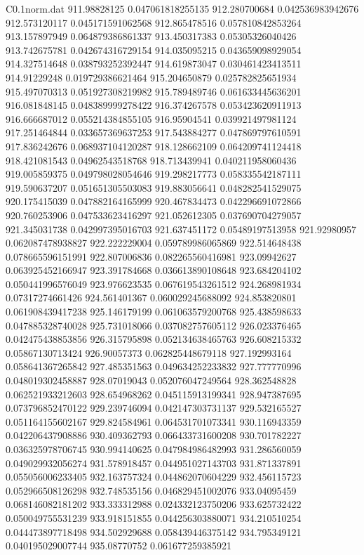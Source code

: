 \begin{filecontents}{C0.1norm.dat}
911.98828125		0.047061818255135
912.280700684		0.042536983942676
912.573120117		0.045171591062568
912.865478516		0.057810842853264
913.157897949		0.064879386861337
913.450317383		0.05305326040426
913.742675781		0.042674316729154
914.035095215		0.043659098929054
914.327514648		0.038793252392447
914.619873047		0.030461423413511
914.91229248		0.019729386621464
915.204650879		0.025782825651934
915.497070313		0.051927308219982
915.789489746		0.061633445636201
916.081848145		0.048389999278422
916.374267578		0.053423620911913
916.666687012		0.055214384855105
916.95904541		0.039921497981124
917.251464844		0.033657369637253
917.543884277		0.047869797610591
917.836242676		0.068937104120287
918.128662109		0.064209741124418
918.421081543		0.04962543518768
918.713439941		0.040211958060436
919.005859375		0.049798028054646
919.298217773		0.058335542187111
919.590637207		0.051651305503083
919.883056641		0.048282541529075
920.175415039		0.047882164165999
920.467834473		0.042296691072866
920.760253906		0.047533623416297
921.052612305		0.037690704279057
921.345031738		0.042997395016703
921.637451172		0.05489197513958
921.92980957		0.062087478938827
922.222229004		0.059789986065869
922.514648438		0.078665596151991
922.807006836		0.082265560416981
923.09942627		0.063925452166947
923.391784668		0.036613890108648
923.684204102		0.050441996576049
923.976623535		0.067619543261512
924.268981934		0.07317274661426
924.561401367		0.060029245688092
924.853820801		0.061908439417238
925.146179199		0.061063579200768
925.438598633		0.047885328740028
925.731018066		0.037082757605112
926.023376465		0.042475438853856
926.315795898		0.052134638465763
926.608215332		0.05867130713424
926.90057373		0.062825448679118
927.192993164		0.058641367265842
927.485351563		0.049634252233832
927.777770996		0.048019302458887
928.07019043		0.052076047249564
928.362548828		0.062521933212603
928.654968262		0.045115913199341
928.947387695		0.073796852470122
929.239746094		0.042147303731137
929.532165527		0.051164155602167
929.824584961		0.064531701073341
930.116943359		0.042206437908886
930.409362793		0.066433731600208
930.701782227		0.036325978706745
930.994140625		0.047984986482993
931.286560059		0.049029932056274
931.578918457		0.044951027143703
931.871337891		0.055056006233405
932.163757324		0.044862070604229
932.456115723		0.052966508126298
932.748535156		0.046829451002076
933.04095459		0.068146082181202
933.333312988		0.024332123750206
933.625732422		0.050049755531239
933.918151855		0.044256303880071
934.210510254		0.044473897718498
934.502929688		0.058439446375142
934.795349121		0.040195029007744
935.08770752		0.061677259385921

\end{filecontents}
